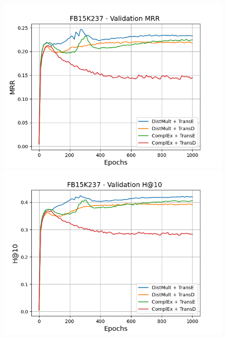 \begin{figure}[H]
    \centering
    \begin{minipage}{.45\textwidth}
      \centering
      \includegraphics[width=0.9\linewidth]{figures/results/gan_train/not_pretrained/uncertainty/max/entropy/fb15k237/1k_epochs/uncertainty_fb15k237_mrrs.png}
    \end{minipage}%
    \begin{minipage}{.45\textwidth}
      \centering
      \includegraphics[width=0.9\linewidth]{figures/results/gan_train/not_pretrained/uncertainty/max/entropy/fb15k237/1k_epochs/uncertainty_fb15k237_hit10.png}
    \end{minipage}
    

\end{figure}
